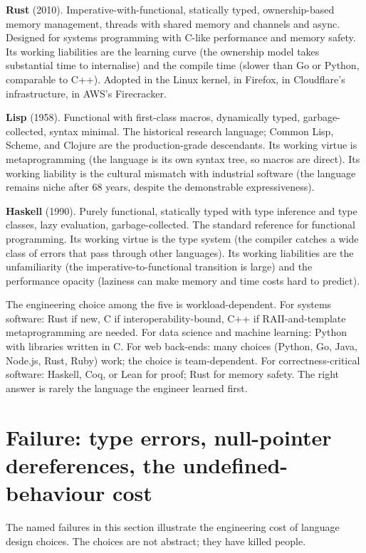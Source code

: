 \textbf{Rust} (2010). Imperative-with-functional, statically typed, ownership-based memory management, threads with shared memory and channels and async. Designed for systems programming with C-like performance and memory safety. Its working liabilities are the learning curve (the ownership model takes substantial time to internalise) and the compile time (slower than Go or Python, comparable to C++). Adopted in the Linux kernel, in Firefox, in Cloudflare's infrastructure, in AWS's Firecracker.

\textbf{Lisp} (1958). Functional with first-class macros, dynamically typed, garbage-collected, syntax minimal. The historical research language; Common Lisp, Scheme, and Clojure are the production-grade descendants. Its working virtue is metaprogramming (the language is its own syntax tree, so macros are direct). Its working liability is the cultural mismatch with industrial software (the language remains niche after $68$ years, despite the demonstrable expressiveness).

\textbf{Haskell} (1990). Purely functional, statically typed with type inference and type classes, lazy evaluation, garbage-collected. The standard reference for functional programming. Its working virtue is the type system (the compiler catches a wide class of errors that pass through other languages). Its working liabilities are the unfamiliarity (the imperative-to-functional transition is large) and the performance opacity (laziness can make memory and time costs hard to predict).

The engineering choice among the five is workload-dependent. For systems software: Rust if new, C if interoperability-bound, C++ if RAII-and-template metaprogramming are needed. For data science and machine learning: Python with libraries written in C. For web back-ends: many choices (Python, Go, Java, Node.js, Rust, Ruby) work; the choice is team-dependent. For correctness-critical software: Haskell, Coq, or Lean for proof; Rust for memory safety. The right answer is rarely the language the engineer learned first.

\section{Failure: type errors, null-pointer dereferences, the undefined-behaviour cost}

The named failures in this section illustrate the engineering cost of language design choices. The choices are not abstract; they have killed people.

